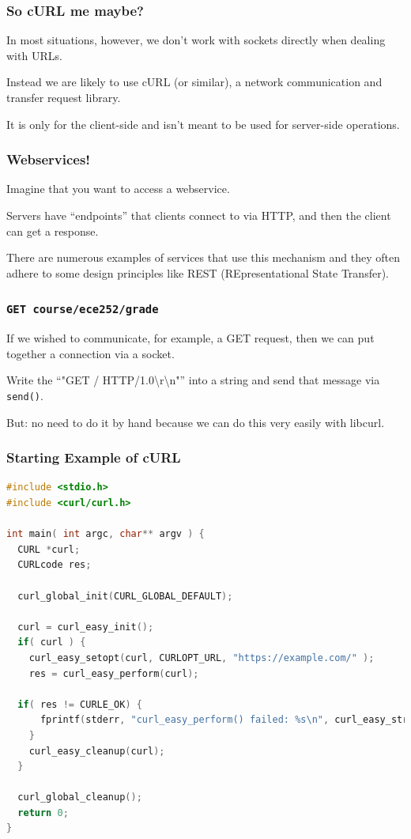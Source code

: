 \begin{frame}
	\frametitle{So cURL me maybe?}

	In most situations, however, we don't work with sockets directly when dealing with URLs.

	Instead we are likely to use cURL (or similar), a network communication and transfer request library.

	It is only for the client-side and isn't meant to be used for server-side operations.

\end{frame}



\begin{frame}
	\frametitle{Webservices!}

	Imagine that you want to access a webservice.

	Servers have ``endpoints'' that clients connect to via HTTP, and then the client can get a response.

	There are numerous examples of services that use this mechanism and they often adhere to some design principles like REST (REpresentational State Transfer).

\end{frame}



\begin{frame}
	\frametitle{\texttt{GET course/ece252/grade}}

	If we wished to communicate, for example, a GET request, then we can put together a connection via a socket.

	Write the ``"GET / HTTP/1.0\textbackslash r\textbackslash n"'' into a string and send that message via \texttt{send()}.

	But: no need to do it by hand because we can do this very easily with libcurl.

\end{frame}



\begin{frame}[fragile]
	\frametitle{Starting Example of cURL}

	\begin{lstlisting}[language=C]
#include <stdio.h>
#include <curl/curl.h>
 
int main( int argc, char** argv ) {
  CURL *curl;
  CURLcode res;
 
  curl_global_init(CURL_GLOBAL_DEFAULT);
 
  curl = curl_easy_init();
  if( curl ) {
    curl_easy_setopt(curl, CURLOPT_URL, "https://example.com/" );
    res = curl_easy_perform(curl);
    
  if( res != CURLE_OK) {
      fprintf(stderr, "curl_easy_perform() failed: %s\n", curl_easy_strerror(res));
    }
    curl_easy_cleanup(curl);
  }
 
  curl_global_cleanup();
  return 0;
}
\end{lstlisting}

\end{frame}



